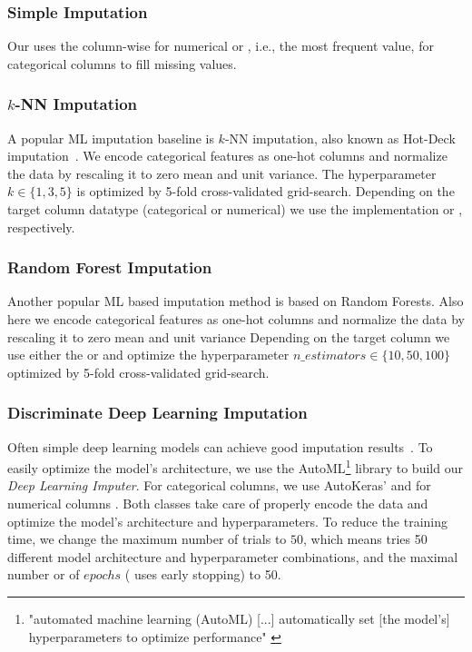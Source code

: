 \subsubsection{Simple Imputation}
%
Our  uses the column-wise  for numerical or , i.e., the most frequent value,  for categorical columns to fill missing values.

\subsubsection{$k$-NN Imputation}
%
A popular ML imputation baseline is $k$-NN imputation, also known as Hot-Deck imputation~\citep{Batista2003}.  We encode categorical features as one-hot columns and normalize the data by rescaling it to zero mean and unit variance. The hyperparameter $k \in \{1, 3, 5\}$ is optimized by 5-fold cross-validated grid-search.
Depending on the target column datatype (categorical or numerical) we use the  implementation  or , respectively.

\subsubsection{Random Forest Imputation}
%
Another popular ML based imputation method is based on Random Forests. Also here we encode categorical features as one-hot columns and normalize the data by rescaling it to zero mean and unit variance
Depending on the target column we use either the  or  and optimize the hyperparameter $n\_estimators \in \{10, 50, 100\}$ optimized by 5-fold cross-validated grid-search.

\subsubsection{Discriminate Deep Learning Imputation}
%
Often simple deep learning models can achieve good imputation results~\cite{Biessmann2018a}. To easily optimize the model's architecture, we use the AutoML\footnote{"automated machine learning (AutoML) [...] automatically set [the model's] hyperparameters to optimize performance" \cite{AutoML}} library  \citep{AutoKeras} to build our \emph{Deep Learning Imputer}.
%
For categorical columns, we use AutoKeras'  and for numerical columns . Both classes take care of properly encode the data and optimize the model's architecture and hyperparameters. To reduce the training time, we change the maximum number of trials to $50$, which means  tries 50 different model architecture and hyperparameter combinations, and the maximal number or of $epochs$ ( uses early stopping) to 50.


